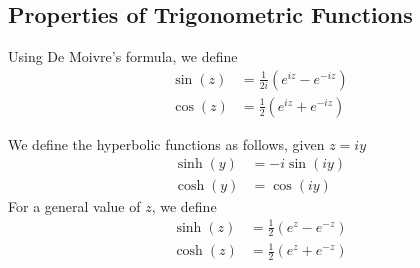 \documentclass[../complete.tex]{subfiles}
\begin{document}
\subsection{Properties of Trigonometric Functions}
\begin{dfn}
	Using De Moivre's formula, we define
	\begin{equation}
		\begin{aligned}
			\sin(z)&=\frac{1}{2i}\left( e^{iz}-e^{-iz} \right)\\
			\cos(z)&=\frac{1}{2}\left( e^{iz}+e^{-iz} \right)
		\end{aligned}
		\label{eq:trigcompfunc}
	\end{equation}
\end{dfn}
\begin{dfn}
	We define the hyperbolic functions as follows, given $z=iy$
	\begin{equation}
		\begin{aligned}
			\sinh(y)&=-i\sin(iy)\\
			\cosh(y)&=\cos(iy)
		\end{aligned}
		\label{eq:hyperbolic}
	\end{equation}
	For a general value of $z$, we define
	\begin{equation}
		\begin{aligned}
			\sinh(z)&=\frac{1}{2}\left( e^z-e^{-z} \right)\\
			\cosh(z)&=\frac{1}{2}\left( e^{z}+e^{-z} \right)
		\end{aligned}
		\label{eq:exphyperbolic}
	\end{equation}
\end{dfn}
\end{document}
